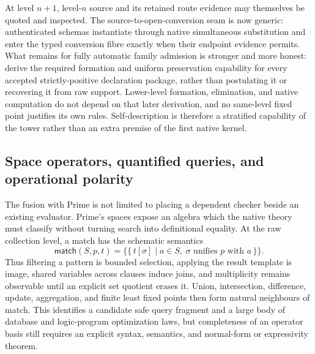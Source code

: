 \documentclass[11pt]{article}
\begin{document}
At level $n+1$, level-$n$ source and its retained route evidence may themselves
be quoted and inspected.  The source-to-open-conversion seam is now generic:
authenticated schemas instantiate through native simultaneous substitution and
enter the typed conversion fibre exactly when their endpoint evidence permits.
What remains for fully automatic family admission is stronger and more honest:
derive the required formation and uniform preservation capability for every
accepted strictly-positive declaration package, rather than postulating it or
recovering it from raw support.  Lower-level formation, elimination, and native
computation do not depend on that later derivation, and no same-level fixed point
justifies its own rules.  Self-description is therefore a stratified capability
of the tower rather than an extra premise of the first native kernel.

\subsection{Space operators, quantified queries, and operational polarity}

The fusion with Prime is not limited to placing a dependent checker beside an
existing evaluator.  Prime's spaces expose an algebra which the native theory
must classify without turning search into definitional equality.  At the raw
collection level, a match has the schematic semantics
\[
 \mathsf{match}(S,p,t)
   = \{\!\{\,t[\sigma] \mid a\in S,
                    \ \sigma\text{ unifies }p\text{ with }a\,\}\!\}.
\]
Thus filtering a pattern is bounded selection, applying the result template is
image, shared variables across clauses induce joins, and multiplicity remains
observable until an explicit set quotient erases it.  Union, intersection,
difference, update, aggregation, and finite least fixed points then form natural
neighbours of match.  This identifies a candidate safe query fragment and a
large body of database and logic-program optimization laws, but completeness of
an operator basis still requires an explicit syntax, semantics, and normal-form
or expressivity theorem.
\end{document}
